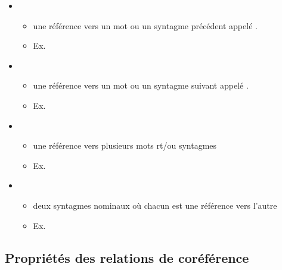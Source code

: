 \documentclass{KodeBook}
\begin{document}
\begin{itemize}
	\item {}
	\begin{itemize}
		\item une référence vers un mot ou un syntagme précédent appelé .
		\item Ex. 
	\end{itemize}
	
	\item {}
	\begin{itemize}
		\item une référence vers un mot ou un syntagme suivant appelé .
		\item Ex. 
	\end{itemize}
	
	\item {}
	\begin{itemize}
		\item une référence vers plusieurs mots rt/ou syntagmes
		\item Ex. 
	\end{itemize}
	
	\item {}
	\begin{itemize}
		\item deux syntagmes nominaux où chacun est une référence vers l'autre
		\item Ex. 
	\end{itemize}
\end{itemize}

\subsection{Propriétés des relations de coréférence}
\end{document}
